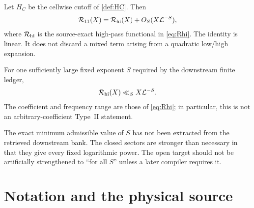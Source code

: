 \begin{theorem}\label{thm:reassembly-main}
Let $H_C$ be the cellwise cutoff of \cref{def:HC}.  Then
\begin{equation}\label{eq:reassembly-main}
          \mathcal R_{11}(X)=\mathcal R_{\mathrm{hi}}(X)+O_S(X\mathcal L^{-S}),
\end{equation}
where $\mathcal R_{\mathrm{hi}}$ is the source-exact high-pass functional in \cref{eq:Rhi}.
The identity is linear.  It does not discard a mixed term arising from a
quadratic low/high expansion.
\end{theorem}

\begin{conjecture}\label{conj:Rhi}
For one sufficiently large fixed exponent $S$ required by the downstream
finite ledger,
\begin{equation}\label{eq:Rhi-target-main}
              \mathcal R_{\mathrm{hi}}(X)\ll_S X\mathcal L^{-S}.
\end{equation}
The coefficient and frequency range are those of \cref{eq:Rhi}; in particular,
this is not an arbitrary-coefficient Type~II statement.
\end{conjecture}

\begin{remark}
The exact minimum admissible value of $S$ has not been extracted from the
retrieved downstream bank.  The closed sectors are stronger than necessary in
that they give every fixed logarithmic power.  The open target should not be
artificially strengthened to ``for all $S$'' unless a later compiler requires
it.
\end{remark}

\section{Notation and the physical source}\label{sec:physical}

